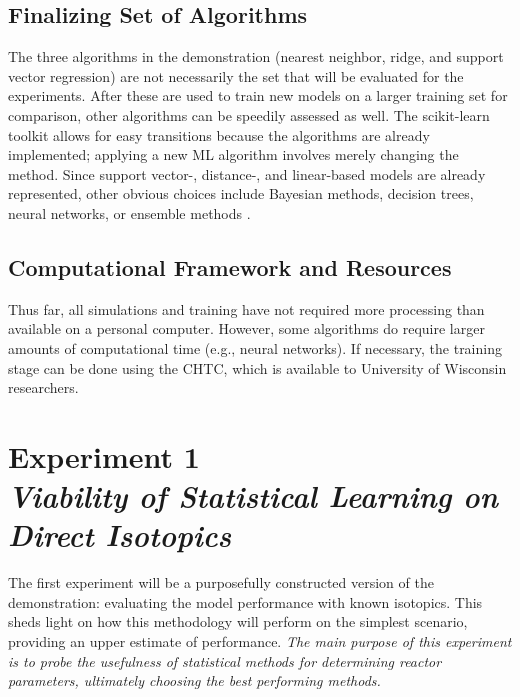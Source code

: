 \subsection*{Finalizing Set of Algorithms}

The three algorithms in the demonstration (nearest neighbor, ridge, and support
vector regression) are not necessarily the set that will be evaluated for the
experiments. After these are used to train new models on a larger training set
for comparison, other algorithms can be speedily assessed as well. The
scikit-learn toolkit allows for easy transitions because the algorithms are
already implemented; applying a new \gls{ML} algorithm involves merely
changing the method.  Since support vector-, distance-, and linear-based models
are already represented, other obvious choices include Bayesian methods,
decision trees, neural networks, or ensemble methods \cite{elements_stats}. 

\subsection*{Computational Framework and Resources}

Thus far, all simulations and training have not required more processing than
available on a personal computer. However, some algorithms do require larger
amounts of computational time (e.g., neural networks).  If necessary, the
training stage can be done using the \gls{CHTC}, which is available to
University of Wisconsin researchers. 

\section[Experiment 1: Direct Isotopics]{Experiment 1\\ 
\large{\textit{Viability of Statistical Learning on Direct Isotopics}}}
\label{sec:exp1}

The first experiment will be a purposefully constructed version of the
demonstration: evaluating the model performance with known isotopics.  This
sheds light on how this methodology will perform on the simplest scenario,
providing an upper estimate of performance.  \textit{The main purpose of this
experiment is to probe the usefulness of statistical methods for
determining reactor parameters, ultimately choosing the best performing
methods.}

